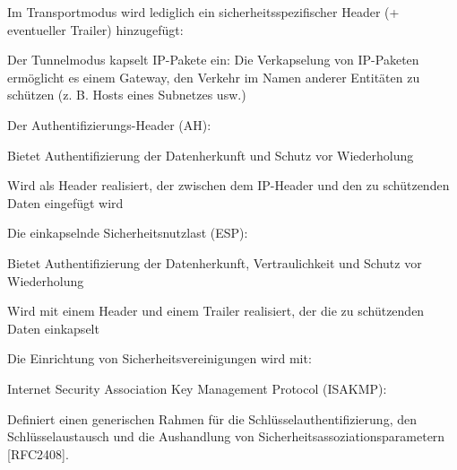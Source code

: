 \documentclass[a4paper]{article}
\begin{document}
\begin{multicols}{3}
      Im Transportmodus wird lediglich ein sicherheitsspezifischer Header (+ eventueller Trailer) hinzugefügt:
      \begin{itemize*} %
            \item Der Tunnelmodus kapselt IP-Pakete ein: Die Verkapselung von IP-Paketen ermöglicht es einem Gateway, den Verkehr im Namen anderer Entitäten zu schützen (z. B. Hosts eines Subnetzes usw.)
            \item Der Authentifizierungs-Header (AH):
            \begin{itemize*}
                  \item Bietet Authentifizierung der Datenherkunft und Schutz vor Wiederholung
                  \item Wird als Header realisiert, der zwischen dem IP-Header und den zu schützenden Daten eingefügt wird
            \end{itemize*}
            \item Die einkapselnde Sicherheitsnutzlast (ESP):
            \begin{itemize*}
                  \item Bietet Authentifizierung der Datenherkunft, Vertraulichkeit und Schutz vor Wiederholung
                  \item Wird mit einem Header und einem Trailer realisiert, der die zu schützenden Daten einkapselt
            \end{itemize*}
            \item Die Einrichtung von Sicherheitsvereinigungen wird mit:
            \begin{itemize*}
                  \item Internet Security Association Key Management Protocol (ISAKMP):
                  \begin{itemize*}
                        \item Definiert einen generischen Rahmen für die Schlüsselauthentifizierung, den Schlüsselaustausch und die Aushandlung von Sicherheitsassoziationsparametern {[}RFC2408{]}.

\end{itemize*}
\end{itemize*}
\end{itemize*}
\end{multicols}
\end{document}
